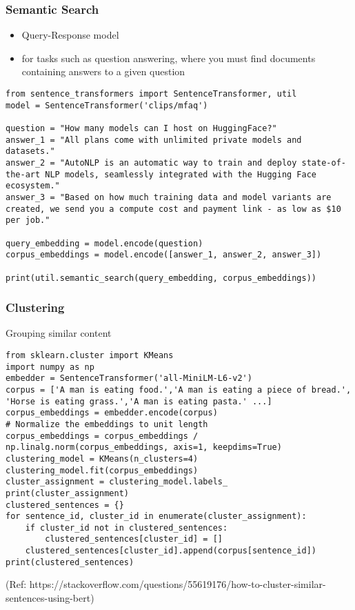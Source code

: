 \begin{frame}[fragile]\frametitle{Semantic Search}

\begin{itemize}
\item Query-Response model
\item for tasks such as question answering, where you must find documents containing answers to a given question
\end{itemize}


\begin{lstlisting}
from sentence_transformers import SentenceTransformer, util
model = SentenceTransformer('clips/mfaq')

question = "How many models can I host on HuggingFace?"
answer_1 = "All plans come with unlimited private models and datasets."
answer_2 = "AutoNLP is an automatic way to train and deploy state-of-the-art NLP models, seamlessly integrated with the Hugging Face ecosystem."
answer_3 = "Based on how much training data and model variants are created, we send you a compute cost and payment link - as low as $10 per job."

query_embedding = model.encode(question)
corpus_embeddings = model.encode([answer_1, answer_2, answer_3])

print(util.semantic_search(query_embedding, corpus_embeddings))
\end{lstlisting}

\end{frame}

\begin{frame}[fragile]\frametitle{Clustering}

Grouping similar content


\begin{lstlisting}
from sklearn.cluster import KMeans
import numpy as np
embedder = SentenceTransformer('all-MiniLM-L6-v2')
corpus = ['A man is eating food.','A man is eating a piece of bread.', 'Horse is eating grass.','A man is eating pasta.' ...]
corpus_embeddings = embedder.encode(corpus)
# Normalize the embeddings to unit length
corpus_embeddings = corpus_embeddings /  np.linalg.norm(corpus_embeddings, axis=1, keepdims=True)
clustering_model = KMeans(n_clusters=4)
clustering_model.fit(corpus_embeddings)
cluster_assignment = clustering_model.labels_
print(cluster_assignment)
clustered_sentences = {}
for sentence_id, cluster_id in enumerate(cluster_assignment):
    if cluster_id not in clustered_sentences:
        clustered_sentences[cluster_id] = []
    clustered_sentences[cluster_id].append(corpus[sentence_id])
print(clustered_sentences)
\end{lstlisting}

{\tiny (Ref: https://stackoverflow.com/questions/55619176/how-to-cluster-similar-sentences-using-bert)}

\end{frame}


